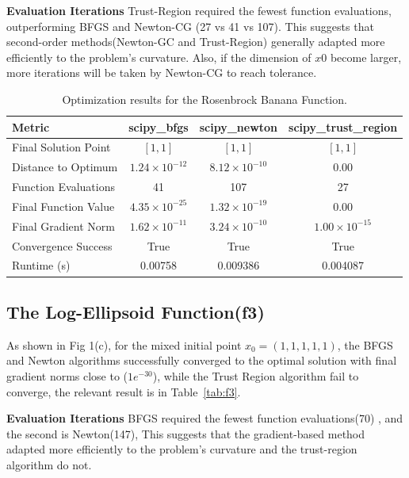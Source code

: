 \documentclass[12pt]{article}
\begin{document}
\textbf{Evaluation Iterations}  
Trust-Region required the fewest function evaluations, outperforming BFGS and Newton-CG (27 vs 41 vs 107). This suggests that second-order methods(Newton-GC and Trust-Region) generally adapted more efficiently to the problem’s curvature. Also, if the dimension of $x0$ become larger, more iterations will be taken by Newton-CG to reach tolerance.


\begin{table}[h]
    \centering
\begin{tabular}{lccc}
    \toprule
    Metric & scipy\_bfgs & scipy\_newton & scipy\_trust\_region \\
    \midrule
    Final Solution Point & $[1, 1]$ & $[1, 1]$ & $[1, 1]$ \\
    Distance to Optimum & $1.24\times10^{-12}$ & $8.12\times10^{-10}$ & $0.00$ \\
    Function Evaluations & 41 & 107 & 27 \\
    Final Function Value & $4.35\times10^{-25}$ & $1.32\times10^{-19}$ & $0.00$ \\
    Final Gradient Norm & $1.62\times10^{-11}$ & $3.24\times10^{-10}$ & $1.00\times10^{-15}$ \\
    Convergence Success & True & True & True \\
    Runtime (s) & 0.00758 & 0.009386 & 0.004087 \\
    \bottomrule
\end{tabular}
    \caption{Optimization results for the Rosenbrock Banana Function.}
    \label{tab:f2}
\end{table}


\subsection{The Log-Ellipsoid Function(f3)}
As shown in Fig 1(c),  for the mixed initial point $x_0 = (1, 1,1 ,1, 1)$, the BFGS and Newton algorithms successfully  converged to the optimal solution with final gradient norms close to ($1e^{-30}$), while the Trust Region algorithm fail to converge, the relevant result is in Table~\ref{tab:f3}.

\textbf{Evaluation Iterations}  BFGS required the fewest function evaluations(70) , and the second is Newton(147),  This suggests that the gradient-based method adapted more efficiently to the problem’s
curvature and the trust-region algorithm do not.
\end{document}
